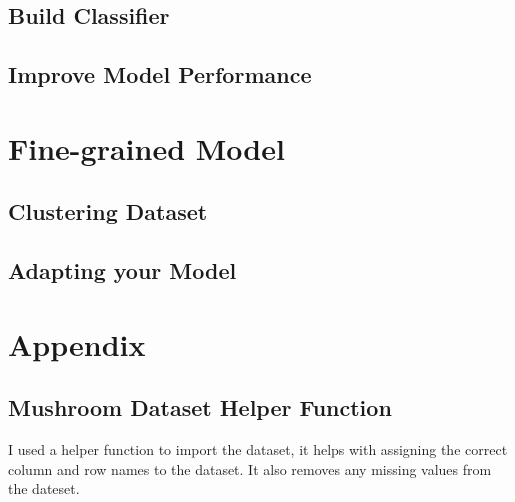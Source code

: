 \documentclass[10pt  ,usenames, dvipsnames]{article}\usepackage[]{graphicx}\usepackage[]{color}
\begin{document}
\subsection{Build Classifier}





\subsection{Improve Model Performance}



\clearpage



\section{Fine-grained Model}


\subsection{Clustering Dataset}




\subsection{Adapting your Model}








\clearpage

\section{Appendix}\label{pubs}

\subsection{Mushroom Dataset Helper Function}

I used a helper function to import the dataset, it helps with assigning the correct column and row names to the dataset. It also removes any missing values from the dateset.
\end{document}
